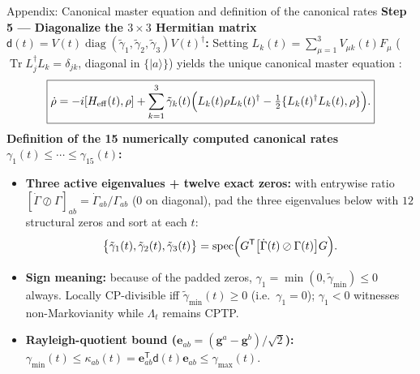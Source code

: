 \documentclass[aspectratio=169,11pt]{beamer}
\newcommand{\ket}[1]{\lvert #1\rangle}
\newcommand{\Tr}{\operatorname{Tr}}
\newcommand{\diag}{\operatorname{diag}}
\newcommand{\spec}{\operatorname{spec}}
\newcommand{\dmat}{\mathsf d}
\newcommand{\Heff}{H_{\mathrm{eff}}}
\begin{document}
\begin{frame}[shrink=4]{Appendix: Canonical master equation and definition of the canonical rates}
\small
\textbf{Step 5 --- Diagonalize the $3\times3$ Hermitian matrix $\dmat(t)=V(t)\diag(\tilde\gamma_1,\tilde\gamma_2,\tilde\gamma_3)V(t)^\dagger$:}
Setting $L_k(t)=\sum_{\mu=1}^3 V_{\mu k}(t)F_\mu$ ($\Tr L_j^\dagger L_k=\delta_{jk}$, diagonal in $\{\ket a\}$) yields the unique canonical master equation \cite{Hall2014}:
\[
\boxed{\dot\rho=-i[\Heff(t),\rho]+\sum_{k=1}^{3}\tilde\gamma_k(t)\Bigl(L_k(t)\rho L_k(t)^\dagger-\tfrac12\{L_k(t)^\dagger L_k(t),\rho\}\Bigr).}
\]
\textbf{Definition of the 15 numerically computed canonical rates $\gamma_1(t)\le\cdots\le\gamma_{15}(t)$:}
\begin{itemize}\setlength\itemsep{3pt}
\item \textbf{Three active eigenvalues + twelve exact zeros:} with entrywise ratio $[\dot\Gamma\oslash\Gamma]_{ab}=\dot\Gamma_{ab}/\Gamma_{ab}$ ($0$ on diagonal), pad the three eigenvalues below with $12$ structural zeros and sort at each $t$:
\[
\bigl\{\tilde\gamma_1(t),\tilde\gamma_2(t),\tilde\gamma_3(t)\bigr\}=\spec\Bigl(G^{\mathsf T}\bigl[\dot\Gamma(t)\oslash\Gamma(t)\bigr]G\Bigr).
\]
\item \textbf{Sign meaning:} because of the padded zeros, $\gamma_1=\min(0,\tilde\gamma_{\min})\le0$ always. Locally CP-divisible iff $\tilde\gamma_{\min}(t)\ge0$ (i.e.\ $\gamma_1=0$); $\gamma_1<0$ witnesses non-Markovianity while $\Lambda_t$ remains CPTP.
\item \textbf{Rayleigh-quotient bound ($\mathbf e_{ab}=(\mathbf g^a-\mathbf g^b)/\sqrt2$):}
$\gamma_{\min}(t)\le\kappa_{ab}(t)=\mathbf e_{ab}^{\mathsf T}\dmat(t)\mathbf e_{ab}\le\gamma_{\max}(t)$.
\end{itemize}
\end{frame}
\end{document}
